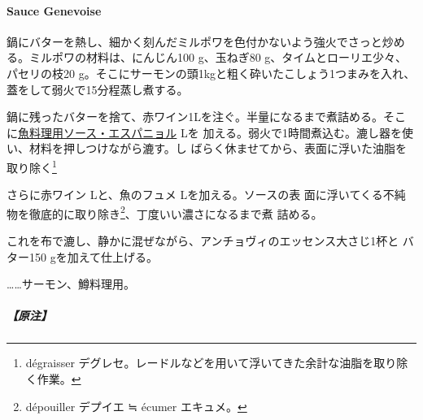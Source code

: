 \begin{recette}
\hypertarget{sauce-genevoise}{%
\paragraph{Sauce Genevoise}\label{sauce-genevoise}}

   

鍋にバターを熱し、細かく刻んだミルポワを色付かないよう強火でさっと炒め
る。ミルポワの材料は、にんじん100 g、玉ねぎ80 g、タイムとローリエ少々、
パセリの枝20 g。そこにサーモンの頭1kgと粗く砕いたこしょう1つまみを入れ、
蓋をして弱火で15分程蒸し煮する。

鍋に残ったバターを捨て、赤ワイン1Lを注ぐ。半量になるまで煮詰める。そこ
に\protect\hyperlink{sauce-espagnole-maigre}{魚料理用ソース・エスパニョル}\undemi{}
Lを
加える。弱火で1時間煮込む。漉し器を使い、材料を押しつけながら漉す。し
ばらく休ませてから、表面に浮いた油脂を取り除く\footnote{dégraisser
  デグレセ。レードルなどを用いて浮いてきた余計な油脂を取り除く作業。}

さらに赤ワイン\undemi{} Lと、魚のフュメ\undemi{} Lを加える。ソースの表
面に浮いてくる不純物を徹底的に取り除き\footnote{dépouiller デプイエ ≒
  écumer エキュメ。}、丁度いい濃さになるまで煮 詰める。

これを布で漉し、静かに混ぜながら、アンチョヴィのエッセンス大さじ1杯と
バター150 gを加えて仕上げる。

\ldots{}\ldots{}サーモン、鱒料理用。

\hypertarget{ux539fux6ce8-3}{%
\subparagraph{【原注】}\label{ux539fux6ce8-3}}


\end{recette}
